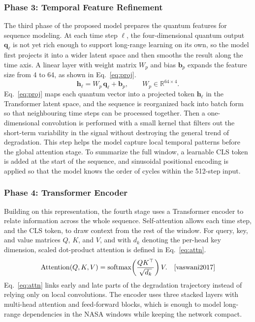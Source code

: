 \documentclass[a4paper,fleqn]{cas-sc}
\begin{document}
\subsubsection{Phase 3: Temporal Feature Refinement}
The third phase of the proposed model prepares the quantum features for sequence modeling. At each time step $\ell$, the four-dimensional quantum output $\mathbf{q}_{\ell}$ is not yet rich enough to support long-range learning on its own, so the model first projects it into a wider latent space and then smooths the result along the time axis. A linear layer with weight matrix $W_{p}$ and bias $\mathbf{b}_{p}$ expands the feature size from 4 to 64, as shown in Eq.~\eqref{eq:proj}.
\begin{equation}
\mathbf{h}_{\ell} = W_{p}\,\mathbf{q}_{\ell} + \mathbf{b}_{p}, \qquad W_{p}\in\mathbb{R}^{64\times 4}.
\label{eq:proj}
\end{equation}
Eq.~\eqref{eq:proj} maps each quantum vector into a projected token $\mathbf{h}_{\ell}$ in the Transformer latent space, and the sequence is reorganized back into batch form so that neighbouring time steps can be processed together. Then a one-dimensional convolution is performed with a small kernel that filters out the short-term variability in the signal without destroying the general trend of degradation. This step helps the model capture local temporal patterns before the global attention stage. To summarize the full window, a learnable CLS token is added at the start of the sequence, and sinusoidal positional encoding is applied so that the model knows the order of cycles within the 512-step input.

\subsubsection{Phase 4: Transformer Encoder}
Building on this representation, the fourth stage uses a Transformer encoder to relate information across the whole sequence. Self-attention allows each time step, and the CLS token, to draw context from the rest of the window. For query, key, and value matrices $Q$, $K$, and $V$, and with $d_{k}$ denoting the per-head key dimension, scaled dot-product attention is defined in Eq.~\eqref{eq:attn}.
\begin{equation}
\mathrm{Attention}(Q,K,V)
=
\mathrm{softmax}\!\left(\frac{QK^{\top}}{\sqrt{d_{k}}}\right)V. \quad \cite{vaswani2017}
\label{eq:attn}
\end{equation}
Eq.~\eqref{eq:attn} links early and late parts of the degradation trajectory instead of relying only on local convolutions. The encoder uses three stacked layers with multi-head attention and feed-forward blocks, which is enough to model long-range dependencies in the NASA windows while keeping the network compact.
\end{document}
